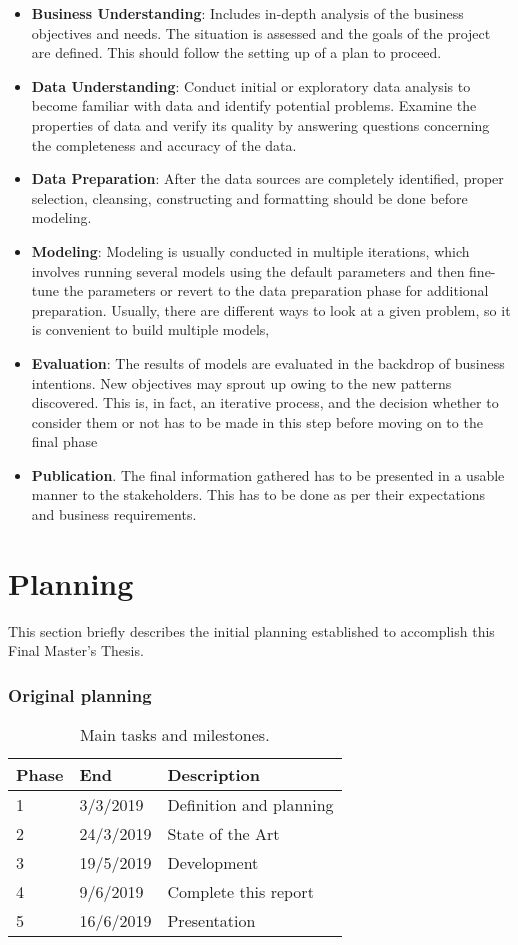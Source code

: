 \begin{itemize}
\item \textbf{Business Understanding}: Includes in-depth analysis of the business objectives and needs. The situation is assessed and the goals of the project are defined. This should follow the setting up of a plan to proceed.
\item \textbf{Data Understanding}: Conduct initial or exploratory data analysis to become familiar with data and identify potential problems. Examine the properties of data and verify its quality by answering questions concerning the completeness and accuracy of the data.
\item \textbf{Data Preparation}: After the data sources are completely identified, proper selection, cleansing, constructing and formatting should be done before modeling. 
\item \textbf{Modeling}: Modeling is usually conducted in multiple iterations, which involves running several models using the default parameters and then fine-tune the parameters or revert to the data preparation phase for additional preparation. Usually, there are different ways to look at a given problem, so it is convenient to build multiple models,
\item \textbf{Evaluation}: The results of models are evaluated in the backdrop of business intentions. New objectives may sprout up owing to the new patterns discovered. This is, in fact, an iterative process, and the decision whether to consider them or not has to be made in this step before moving on to the final phase
\item \textbf{Publication}. The final information gathered has to be presented in a usable manner to the stakeholders.  This has to be done as per their expectations and business requirements.
\end{itemize}


\section{Planning}

This section briefly describes the initial planning established to accomplish this Final Master's Thesis.

\subsubsection{Original planning}

\begin{table}[ht]
\centering
\caption{Main tasks and milestones.}
\label{tab:planning}
\begin{tabular}[t]{lll}
    \toprule
    Phase & End  & Description\\
    \midrule
    1 & 3/3/2019 & Definition and planning\\
    2 & 24/3/2019 & State of the Art\\
    3 & 19/5/2019 & Development\\
    4 & 9/6/2019 & Complete this report\\
    5 & 16/6/2019 & Presentation\\
    \bottomrule
\end{tabular}
\end{table}

